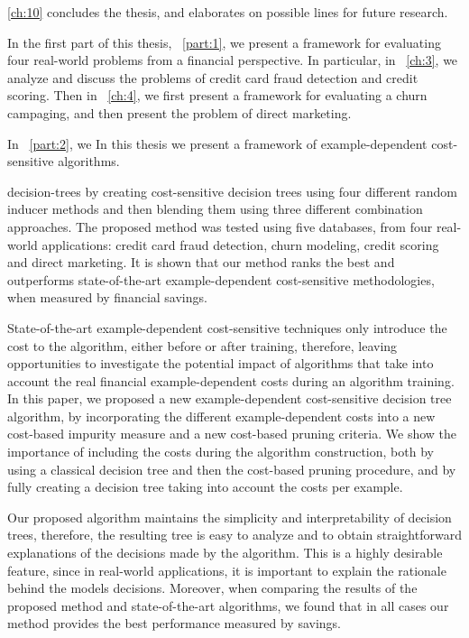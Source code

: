 \chaptername{ \ref{ch:10}} concludes the thesis, and elaborates on possible lines for future 
research.



In the first part of this thesis, \partname{~\ref{part:1}}, we present a framework for evaluating 
four real-world problems from a financial perspective. In particular, in \chaptername{~\ref{ch:3}}, 
we analyze and discuss the problems of credit card fraud detection and credit scoring. Then in 
\chaptername{~\ref{ch:4}}, we first present a framework for evaluating a churn campaging, and then 
present the problem of direct marketing.


In \partname{~\ref{part:2}}, we
In this thesis we present a framework of example-dependent cost-sensitive algorithms.


decision-trees by creating cost-sensitive decision trees using four different 
random inducer methods and then blending them using three different combination approaches.
The proposed method was tested using five databases, from four real-world applications: credit 
card fraud detection, churn modeling, credit scoring and direct marketing. It is shown that our 
method ranks the best and outperforms state-of-the-art example-dependent cost-sensitive 
methodologies, when measured by financial savings.




State-of-the-art example-dependent cost-sensitive techniques only introduce the cost to the 
algorithm, either before or after training, therefore, leaving opportunities to investigate
the potential impact of algorithms that take into account the real financial example-dependent 
costs during an algorithm training. In this paper, we proposed a new example-dependent 
cost-sensitive decision tree algorithm, by incorporating the different example-dependent costs into 
a new cost-based impurity measure and a new cost-based pruning criteria. We show the importance of 
including the costs during the algorithm construction, both by using a classical decision tree 
and then the cost-based pruning procedure, and by fully creating a decision tree taking into 
account 
the costs per example.

 Our proposed algorithm maintains the simplicity and interpretability of decision trees, 
therefore, the resulting tree is easy to analyze and to obtain straightforward explanations of 
the decisions made by the algorithm. This is a highly desirable feature, since in real-world 
applications, it is important to explain the rationale behind the models decisions.
Moreover, when comparing the results of the proposed method and state-of-the-art algorithms, 
we found that in all cases our method provides the best performance measured by savings.

